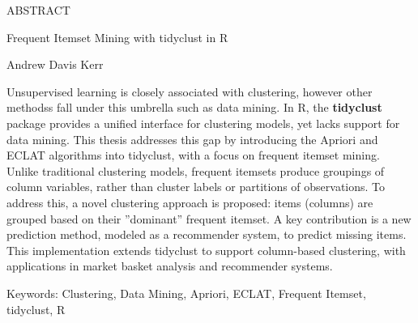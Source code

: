 \begin{center}
{{\MakeUppercase{Abstract}}\par
Frequent Itemset Mining with tidyclust in R\par
Andrew Davis Kerr\par
}
\end{center}

Unsupervised learning is closely associated with clustering, however other methodss
fall under this umbrella such as data mining. In R, the \textbf{tidyclust} package provides a 
unified interface for clustering models, yet lacks support for data mining. This 
thesis addresses this gap by introducing the Apriori and ECLAT algorithms into tidyclust, 
with a focus on frequent itemset mining. Unlike traditional clustering models, frequent 
itemsets produce groupings of column variables, rather than cluster labels or partitions 
of observations. To address this, a novel clustering approach is proposed: items (columns) 
are grouped based on their ”dominant” frequent itemset. A key contribution is a new
prediction method, modeled as a recommender system, to predict missing items. This 
implementation extends tidyclust to support column-based clustering, with applications 
in market basket analysis and recommender systems.

\par
\vspace*{\fill}
{Keywords}: Clustering, Data Mining, Apriori, ECLAT, Frequent Itemset, tidyclust, R
\vspace{0.5in}
\newpage